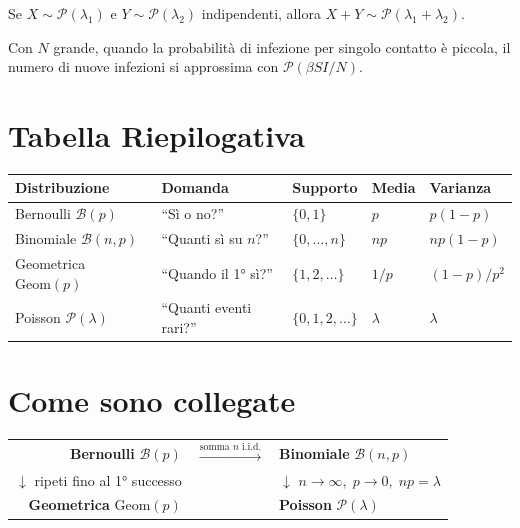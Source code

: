 \documentclass[a4paper,11pt]{article}
\begin{document}
\begin{tcolorbox}[mybox=orange, title=Somma di Poisson (righe 460--462)]
Se $X \sim \mathcal{P}(\lambda_1)$ e $Y \sim \mathcal{P}(\lambda_2)$ indipendenti, allora $X + Y \sim \mathcal{P}(\lambda_1 + \lambda_2)$.
\end{tcolorbox}

\begin{tcolorbox}[mybox=green, title=Nel modello SIR]
Con $N$ grande, quando la probabilità di infezione per singolo contatto è piccola, il numero di nuove infezioni si approssima con $\mathcal{P}(\beta S I / N)$.
\end{tcolorbox}

\section{Tabella Riepilogativa}

\begin{center}
\begin{tabular}{lllll}
\toprule
\textbf{Distribuzione} & \textbf{Domanda} & \textbf{Supporto} & \textbf{Media} & \textbf{Varianza} \\
\midrule
Bernoulli $\mathcal{B}(p)$ & ``Sì o no?'' & $\{0, 1\}$ & $p$ & $p(1-p)$ \\
Binomiale $\mathcal{B}(n,p)$ & ``Quanti sì su $n$?'' & $\{0, \dots, n\}$ & $np$ & $np(1-p)$ \\
Geometrica $\text{Geom}(p)$ & ``Quando il 1° sì?'' & $\{1, 2, \dots\}$ & $1/p$ & $(1-p)/p^2$ \\
Poisson $\mathcal{P}(\lambda)$ & ``Quanti eventi rari?'' & $\{0, 1, 2, \dots\}$ & $\lambda$ & $\lambda$ \\
\bottomrule
\end{tabular}
\end{center}

\section{Come sono collegate}

\begin{center}
\begin{tabular}{rcl}
\textbf{Bernoulli} $\mathcal{B}(p)$ & $\xrightarrow{\text{somma } n \text{ i.i.d.}}$ & \textbf{Binomiale} $\mathcal{B}(n,p)$ \\[8pt]
$\downarrow$ \scriptsize{ripeti fino al 1° successo} & & $\downarrow$ \scriptsize{$n\to\infty,\; p\to 0,\; np=\lambda$} \\[8pt]
\textbf{Geometrica} $\text{Geom}(p)$ & & \textbf{Poisson} $\mathcal{P}(\lambda)$ \\
\end{tabular}
\end{center}
\end{document}
